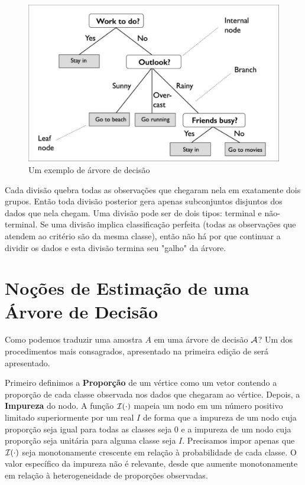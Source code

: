 \begin{figure}
    \centering
    \includegraphics[scale = .25]{imagens/arvore.png}
    \caption{Um exemplo de árvore de decisão}
    \label{fig:arvore}
\end{figure}

Cada divisão quebra todas as observações que chegaram nela em exatamente dois grupos. Então toda divisão posterior gera apenas subconjuntos disjuntos dos dados que nela chegam. Uma divisão pode ser de dois tipos: terminal e não-terminal. Se uma divisão implica classificação perfeita (todas as observações que atendem ao critério são da mesma classe), então não há por que continuar a dividir os dados e esta divisão termina seu "galho" da árvore. 


\section{Noções de Estimação de uma Árvore de Decisão}

Como podemos traduzir uma amostra $A$ em uma árvore de decisão $\mathcal{A}$? Um dos procedimentos mais consagrados, apresentado na primeira edição de  será apresentado.

Primeiro definimos a \textbf{Proporção} de um vértice como um vetor contendo a proporção de cada classe observada nos dados que chegaram ao vértice. Depois, a \textbf{Impureza} do nodo. A função $\mathcal{I}(\cdot)$ mapeia um nodo em um número positivo limitado superiormente por um real $I$ de forma que a impureza de um nodo cuja proporção seja igual para todas as classes seja $0$ e a impureza de um nodo cuja proporção seja unitária para alguma classe seja $I$. Precisamos impor apenas que $\mathcal{I}(\cdot)$ seja monotonamente crescente em relação à probabilidade de cada classe. O valor específico da impureza não é relevante, desde que aumente monotonamente em relação à heterogeneidade de proporções observadas.

